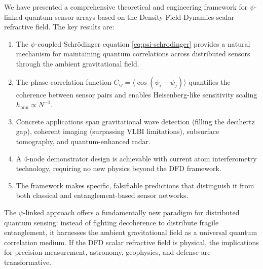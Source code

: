 \documentclass[12pt,a4paper]{article}
\theoremstyle{remark}
\begin{document}
We have presented a comprehensive theoretical and engineering framework for
$\psi$-linked quantum sensor arrays based on the Density Field Dynamics
scalar refractive field. The key results are:

\begin{enumerate}
\item The $\psi$-coupled Schr\"odinger equation
\eqref{eq:psi-schrodinger} provides a natural mechanism for maintaining
quantum correlations across distributed sensors through the ambient
gravitational field.

\item The phase correlation function
$C_{ij} = \langle\cos(\psi_i - \psi_j)\rangle$ quantifies the coherence
between sensor pairs and enables Heisenberg-like sensitivity scaling
$h_{\min} \propto N^{-1}$.

\item Concrete applications span gravitational wave detection (filling
the decihertz gap), coherent imaging (surpassing VLBI limitations),
subsurface tomography, and quantum-enhanced radar.

\item A 4-node demonstrator design is achievable with current atom
interferometry technology, requiring no new physics beyond the DFD
framework.

\item The framework makes specific, falsifiable predictions that
distinguish it from both classical and entanglement-based sensor networks.
\end{enumerate}

The $\psi$-linked approach offers a fundamentally new paradigm for
distributed quantum sensing: instead of fighting decoherence to distribute
fragile entanglement, it harnesses the ambient gravitational field as a
universal quantum correlation medium. If the DFD scalar refractive field
is physical, the implications for precision measurement, astronomy,
geophysics, and defense are transformative.


\end{document}
